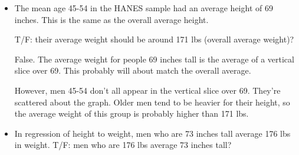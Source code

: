\documentclass[landscape]{exam}
\begin{document}
\begin{itemize}

    \item The mean age 45-54 in the HANES sample had an average height of 69
      inches.  This is the same as the overall average height.

      T/F: their average weight should be around 171 lbs (overall average weight)?

      \begin{solution}
        False.  The average weight for people 69 inches tall is the average of a
        vertical slice over 69.  This probably will about match the overall average.

        However, men 45-54 don't all appear in the vertical slice over 69.  They're
        scattered about the graph.  Older men tend to be heavier for their height, so
        the average weight of this group is probably higher than 171 lbs.
      \end{solution}

    \item In regression of height to weight, men who are 73 inches tall average 176
      lbs in weight.  T/F: men who are 176 lbs average 73 inches tall?
  \end{itemize}
\end{document}
